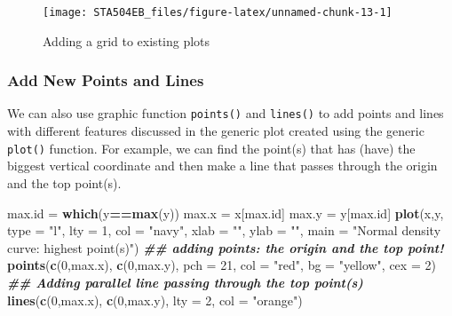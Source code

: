 \documentclass[
]{book}
\newenvironment{Shaded}{\begin{snugshade}}{\end{snugshade}}
\newcommand{\AttributeTok}[1]{\textcolor[rgb]{0.13,0.29,0.53}{#1}}
\newcommand{\DecValTok}[1]{\textcolor[rgb]{0.00,0.00,0.81}{#1}}
\newcommand{\DocumentationTok}[1]{\textcolor[rgb]{0.56,0.35,0.01}{\textbf{\textit{#1}}}}
\newcommand{\FunctionTok}[1]{\textcolor[rgb]{0.13,0.29,0.53}{\textbf{#1}}}
\newcommand{\NormalTok}[1]{#1}
\newcommand{\OtherTok}[1]{\textcolor[rgb]{0.56,0.35,0.01}{#1}}
\newcommand{\SpecialCharTok}[1]{\textcolor[rgb]{0.81,0.36,0.00}{\textbf{#1}}}
\newcommand{\StringTok}[1]{\textcolor[rgb]{0.31,0.60,0.02}{#1}}
\begin{document}
\begin{figure}

{\centering \texttt{[image: STA504EB\_files/figure-latex/unnamed-chunk-13-1]} 

}

\caption{Adding a grid to existing plots}\label{fig:unnamed-chunk-13}
\end{figure}

\hypertarget{add-new-points-and-lines}{%
\subsubsection{Add New Points and Lines}\label{add-new-points-and-lines}}

We can also use graphic function \texttt{points()} and \texttt{lines()} to add points and lines with different features discussed in the generic plot created using the generic \texttt{plot()} function. For example, we can find the point(s) that has (have) the biggest vertical coordinate and then make a line that passes through the origin and the top point(s).

\begin{Shaded}
\begin{Highlighting}[]
\NormalTok{max.id }\OtherTok{=} \FunctionTok{which}\NormalTok{(y}\SpecialCharTok{==}\FunctionTok{max}\NormalTok{(y))}
\NormalTok{max.x }\OtherTok{=}\NormalTok{ x[max.id]}
\NormalTok{max.y }\OtherTok{=}\NormalTok{ y[max.id]}
\FunctionTok{plot}\NormalTok{(x,y, }\AttributeTok{type =} \StringTok{"l"}\NormalTok{, }\AttributeTok{lty =} \DecValTok{1}\NormalTok{, }\AttributeTok{col =} \StringTok{"navy"}\NormalTok{, }\AttributeTok{xlab =} \StringTok{""}\NormalTok{, }\AttributeTok{ylab =} \StringTok{""}\NormalTok{,}
     \AttributeTok{main =} \StringTok{"Normal density curve: highest point(s)"}\NormalTok{)}
\DocumentationTok{\#\# adding points: the origin and the top point!}
\FunctionTok{points}\NormalTok{(}\FunctionTok{c}\NormalTok{(}\DecValTok{0}\NormalTok{,max.x), }\FunctionTok{c}\NormalTok{(}\DecValTok{0}\NormalTok{,max.y), }\AttributeTok{pch =} \DecValTok{21}\NormalTok{, }\AttributeTok{col =} \StringTok{"red"}\NormalTok{, }\AttributeTok{bg =} \StringTok{"yellow"}\NormalTok{, }\AttributeTok{cex =} \DecValTok{2}\NormalTok{)}
\DocumentationTok{\#\# Adding parallel line passing through the top point(s)}
\FunctionTok{lines}\NormalTok{(}\FunctionTok{c}\NormalTok{(}\DecValTok{0}\NormalTok{,max.x), }\FunctionTok{c}\NormalTok{(}\DecValTok{0}\NormalTok{,max.y), }\AttributeTok{lty =} \DecValTok{2}\NormalTok{, }\AttributeTok{col =} \StringTok{"orange"}\NormalTok{)}
\end{Highlighting}
\end{Shaded}
\end{document}
